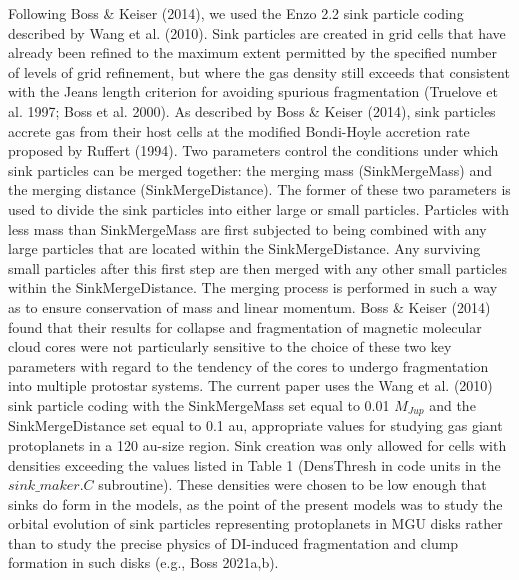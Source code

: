 \documentclass[12pt,preprint]{aastex}
\begin{document}
 Following Boss \& Keiser (2014), we used the Enzo 2.2 sink particle coding described by Wang et al. (2010). Sink particles are 
created in grid cells that have already been refined to the maximum extent permitted by the specified number of levels 
of grid refinement, but where the gas density still exceeds that consistent with the Jeans length criterion for avoiding
spurious fragmentation (Truelove et al. 1997; Boss et al. 2000). As described by Boss \& Keiser (2014),
sink particles accrete gas from their host cells at the modified Bondi-Hoyle accretion rate proposed by Ruffert (1994). 
Two parameters control the conditions under which sink particles can be merged together: the merging mass (SinkMergeMass) 
and the merging distance (SinkMergeDistance). The former of these two parameters is used to divide 
the sink particles into either large or small particles. Particles with less mass than SinkMergeMass are first subjected 
to being combined with any large particles that are located within the SinkMergeDistance. Any surviving small particles 
after this first step are then merged with any other small particles within the SinkMergeDistance. The merging process 
is performed in such a way as to ensure conservation of mass and linear momentum. Boss \& Keiser (2014) found that
their results for collapse and fragmentation of magnetic molecular cloud cores were not particularly sensitive
to the choice of these two key parameters with regard to the tendency of the cores to undergo fragmentation into
multiple protostar systems. The current paper uses the Wang et al. (2010) sink particle coding with the 
SinkMergeMass set equal to 0.01 $M_{Jup}$ and the SinkMergeDistance set equal to 0.1 au, appropriate
values for studying gas giant protoplanets in a 120 au-size region. Sink creation was only allowed for cells with
densities exceeding the values listed in Table 1 (DensThresh in code units in the $sink\_maker.C$ subroutine).
These densities were chosen to be low enough that sinks do form in the models, as the point of the present
models was to study the orbital evolution of sink particles representing protoplanets in MGU disks rather than 
to study the precise physics of DI-induced fragmentation and clump formation in such disks 
(e.g., Boss 2021a,b). 
\end{document}
